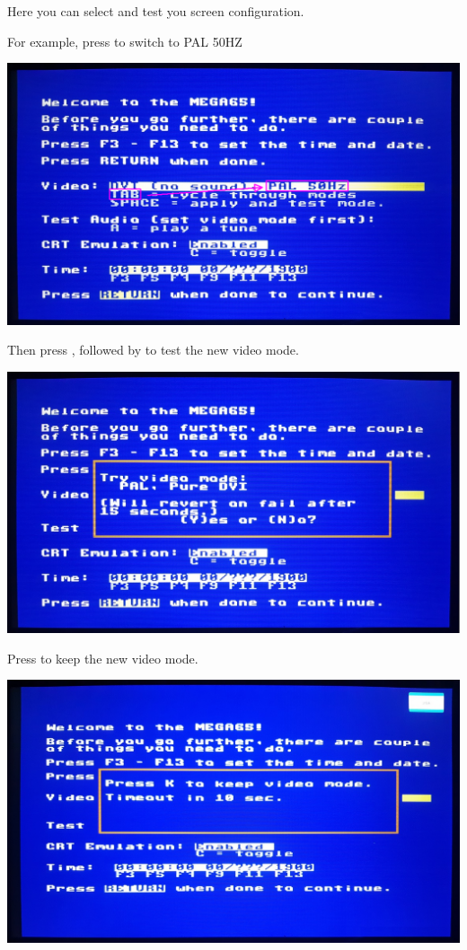 Here you can select and test you screen configuration.

For example, press  to switch to PAL 50HZ

\begin{center}
  \includegraphics[width=0.7\linewidth]{images/img011_final_boot_02.png}
\end{center}

Then press  , followed by  to test the new video mode.

\begin{center}
  \includegraphics[width=0.7\linewidth]{images/img011_final_boot_03.jpg}
\end{center}

Press  to keep the new video mode.

\begin{center}
  \includegraphics[width=0.7\linewidth]{images/img011_final_boot_04.jpg}
\end{center}

